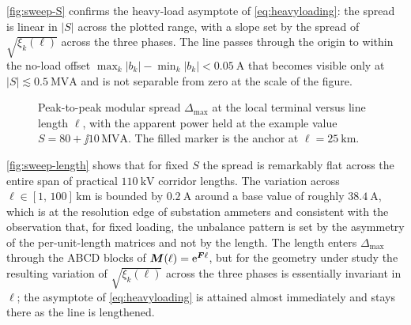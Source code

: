 \autoref{fig:sweep-S} confirms the heavy-load asymptote of
\autoref{eq:heavyloading}: the spread is linear in $|S|$ across the
plotted range, with a slope set by the spread of $\sqrt{\xi_{k}(\ell)}$
across the three phases. The line passes through the origin to within
the no-load offset $\max_{k}|b_{k}|-\min_{k}|b_{k}|<\SI{0.05}{\ampere}$
that becomes visible only at $|S|\lesssim\SI{0.5}{\mega\volt\ampere}$
and is not separable from zero at the scale of the figure.

\begin{figure}[ht]
\centering
{}
\caption{Peak-to-peak modular spread $\Delta_{\max}$ at the local
terminal versus line length $\ell$, with the apparent power held at the
example value $S=80+\jj 10\,\si{\mega\volt\ampere}$. The filled marker
is the anchor at $\ell=\SI{25}{\kilo\metre}$.}
\label{fig:sweep-length}
\end{figure}

\autoref{fig:sweep-length} shows that for fixed $S$ the spread is
remarkably flat across the entire span of practical
$\SI{110}{\kilo\volt}$ corridor lengths. The variation across
$\ell\in[1,\,100]\,\si{\kilo\metre}$ is bounded by
$\SI{0.2}{\ampere}$ around a base value of roughly
$\SI{38.4}{\ampere}$, which is at the resolution edge of substation
ammeters and consistent with the observation that, for fixed loading,
the unbalance pattern is set by the asymmetry of the per-unit-length
matrices and not by the length. The length enters $\Delta_{\max}$
through the ABCD blocks of $\bm{M}(\ell)=\mathrm{e}^{\bm{F}\ell}$, but for the
geometry under study the resulting variation of
$\sqrt{\xi_{k}(\ell)}$ across the three phases is essentially
invariant in $\ell$; the asymptote of \autoref{eq:heavyloading} is
attained almost immediately and stays there as the line is lengthened.
